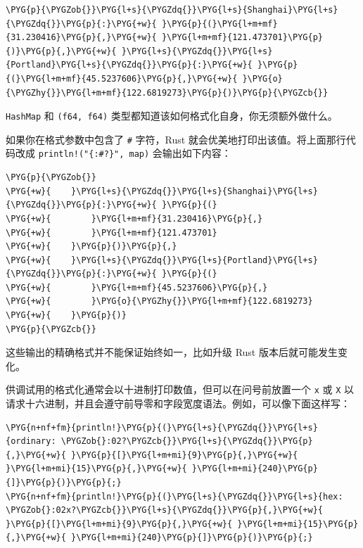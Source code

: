 \begin{Verbatim}[commandchars=\\\{\},breaklines=true,breakanywhere=true,fontsize=\codefont,xleftmargin=17bp]
\PYG{p}{\PYGZob{}}\PYG{l+s}{\PYGZdq{}}\PYG{l+s}{Shanghai}\PYG{l+s}{\PYGZdq{}}\PYG{p}{:}\PYG{+w}{ }\PYG{p}{(}\PYG{l+m+mf}{31.230416}\PYG{p}{,}\PYG{+w}{ }\PYG{l+m+mf}{121.473701}\PYG{p}{)}\PYG{p}{,}\PYG{+w}{ }\PYG{l+s}{\PYGZdq{}}\PYG{l+s}{Portland}\PYG{l+s}{\PYGZdq{}}\PYG{p}{:}\PYG{+w}{ }\PYG{p}{(}\PYG{l+m+mf}{45.5237606}\PYG{p}{,}\PYG{+w}{ }\PYG{o}{\PYGZhy{}}\PYG{l+m+mf}{122.6819273}\PYG{p}{)}\PYG{p}{\PYGZcb{}}
\end{Verbatim}

\texttt{HashMap} 和 \texttt{(f64, f64)} 类型都知道该如何格式化自身，你无须额外做什么。

如果你在格式参数中包含了 \texttt{\#} 字符，Rust 就会优美地打印出该值。将上面那行代码改成 \texttt{println!("\{:\#?\}", map)} 会输出如下内容：

\begin{Verbatim}[commandchars=\\\{\},breaklines=true,breakanywhere=true,fontsize=\codefont,xleftmargin=17bp]
\PYG{p}{\PYGZob{}}
\PYG{+w}{    }\PYG{l+s}{\PYGZdq{}}\PYG{l+s}{Shanghai}\PYG{l+s}{\PYGZdq{}}\PYG{p}{:}\PYG{+w}{ }\PYG{p}{(}
\PYG{+w}{        }\PYG{l+m+mf}{31.230416}\PYG{p}{,}
\PYG{+w}{        }\PYG{l+m+mf}{121.473701}
\PYG{+w}{    }\PYG{p}{)}\PYG{p}{,}
\PYG{+w}{    }\PYG{l+s}{\PYGZdq{}}\PYG{l+s}{Portland}\PYG{l+s}{\PYGZdq{}}\PYG{p}{:}\PYG{+w}{ }\PYG{p}{(}
\PYG{+w}{        }\PYG{l+m+mf}{45.5237606}\PYG{p}{,}
\PYG{+w}{        }\PYG{o}{\PYGZhy{}}\PYG{l+m+mf}{122.6819273}
\PYG{+w}{    }\PYG{p}{)}
\PYG{p}{\PYGZcb{}}
\end{Verbatim}

这些输出的精确格式并不能保证始终如一，比如升级 Rust 版本后就可能发生变化。

供调试用的格式化通常会以十进制打印数值，但可以在问号前放置一个 \texttt{x} 或 \texttt{X} 以请求十六进制，并且会遵守前导零和字段宽度语法。例如，可以像下面这样写：

\begin{Verbatim}[commandchars=\\\{\},breaklines=true,breakanywhere=true,fontsize=\codefont,xleftmargin=17bp]
\PYG{n+nf+fm}{println!}\PYG{p}{(}\PYG{l+s}{\PYGZdq{}}\PYG{l+s}{ordinary: \PYGZob{}:02?\PYGZcb{}}\PYG{l+s}{\PYGZdq{}}\PYG{p}{,}\PYG{+w}{ }\PYG{p}{[}\PYG{l+m+mi}{9}\PYG{p}{,}\PYG{+w}{ }\PYG{l+m+mi}{15}\PYG{p}{,}\PYG{+w}{ }\PYG{l+m+mi}{240}\PYG{p}{]}\PYG{p}{)}\PYG{p}{;}
\PYG{n+nf+fm}{println!}\PYG{p}{(}\PYG{l+s}{\PYGZdq{}}\PYG{l+s}{hex:      \PYGZob{}:02x?\PYGZcb{}}\PYG{l+s}{\PYGZdq{}}\PYG{p}{,}\PYG{+w}{ }\PYG{p}{[}\PYG{l+m+mi}{9}\PYG{p}{,}\PYG{+w}{ }\PYG{l+m+mi}{15}\PYG{p}{,}\PYG{+w}{ }\PYG{l+m+mi}{240}\PYG{p}{]}\PYG{p}{)}\PYG{p}{;}
\end{Verbatim}

